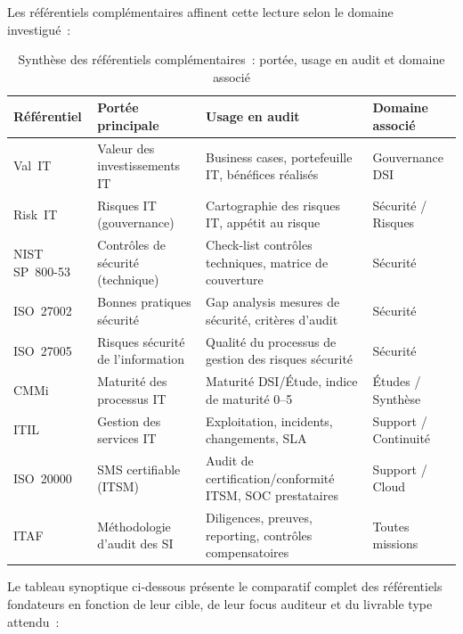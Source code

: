 Les référentiels complémentaires affinent cette lecture selon le domaine investigué~:

\begin{table}[H]
\centering
\small
\renewcommand{\arraystretch}{1.4}
\caption{Synthèse des référentiels complémentaires~: portée, usage en audit et domaine associé}
\label{tab:synthese-referentiels}
\begin{tabular}{|p{2.4cm}|p{2.8cm}|p{4.2cm}|p{2.8cm}|}
    \hline
    \rowcolor{gray!20}
    \textbf{Référentiel} & \textbf{Portée principale} &
    \textbf{Usage en audit} & \textbf{Domaine associé} \\ \hline
    Val~IT & Valeur des investissements IT &
    Business cases, portefeuille IT, bénéfices réalisés & Gouvernance DSI \\ \hline
    Risk~IT & Risques IT (gouvernance) &
    Cartographie des risques IT, appétit au risque & Sécurité / Risques \\ \hline
    NIST SP~800-53 & Contrôles de sécurité (technique) &
    Check-list contrôles techniques, matrice de couverture & Sécurité \\ \hline
    ISO~27002 & Bonnes pratiques sécurité &
    Gap analysis mesures de sécurité, critères d'audit & Sécurité \\ \hline
    ISO~27005 & Risques sécurité de l'information &
    Qualité du processus de gestion des risques sécurité & Sécurité \\ \hline
    CMMi & Maturité des processus IT &
    Maturité DSI/Étude, indice de maturité 0--5 & Études / Synthèse \\ \hline
    ITIL & Gestion des services IT &
    Exploitation, incidents, changements, SLA & Support / Continuité \\ \hline
    ISO~20000 & SMS certifiable (ITSM) &
    Audit de certification/conformité ITSM, SOC prestataires & Support / Cloud \\ \hline
    ITAF & Méthodologie d'audit des SI &
    Diligences, preuves, reporting, contrôles compensatoires & Toutes missions \\ \hline
\end{tabular}
\end{table}

Le tableau synoptique ci-dessous présente le comparatif complet des référentiels fondateurs en
fonction de leur cible, de leur focus auditeur et du livrable type attendu~:

